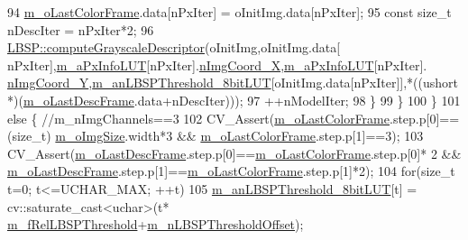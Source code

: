 \begin{DoxyCode}
94                 \mbox{\hyperlink{class_background_subtractor_l_b_s_p_ab1dc003792ab1d0b881a6fd10e0e29b3}{m\_oLastColorFrame}}.data[nPxIter] = oInitImg.data[nPxIter];
95                 \textcolor{keyword}{const} \textcolor{keywordtype}{size\_t} nDescIter = nPxIter*2;
96                 \mbox{\hyperlink{class_l_b_s_p_a4a5f635868b6b81ba53df2692ee3dfd8}{LBSP::computeGrayscaleDescriptor}}(oInitImg,oInitImg.data[
      nPxIter],\mbox{\hyperlink{class_background_subtractor_l_b_s_p_a74e73d4832ccdef652d93756582024db}{m\_aPxInfoLUT}}[nPxIter].\mbox{\hyperlink{struct_background_subtractor_l_b_s_p_1_1_px_info_base_a10966fe72f000045adede9e853156b48}{nImgCoord\_X}},\mbox{\hyperlink{class_background_subtractor_l_b_s_p_a74e73d4832ccdef652d93756582024db}{m\_aPxInfoLUT}}[nPxIter].
      \mbox{\hyperlink{struct_background_subtractor_l_b_s_p_1_1_px_info_base_a42cb6eecda647b2a11b90ea420f2bc31}{nImgCoord\_Y}},\mbox{\hyperlink{class_background_subtractor_l_b_s_p_aefe69d94f08b2c4ba73ad1d254ad9153}{m\_anLBSPThreshold\_8bitLUT}}[oInitImg.data[nPxIter]],*((ushort
      *)(\mbox{\hyperlink{class_background_subtractor_l_b_s_p_a9c637c0b87cac495887295690d83ba13}{m\_oLastDescFrame}}.data+nDescIter)));
97                 ++nModelIter;
98             \}
99         \}
100     \}
101     \textcolor{keywordflow}{else} \{ \textcolor{comment}{//m\_nImgChannels==3}
102         CV\_Assert(\mbox{\hyperlink{class_background_subtractor_l_b_s_p_ab1dc003792ab1d0b881a6fd10e0e29b3}{m\_oLastColorFrame}}.step.p[0]==(\textcolor{keywordtype}{size\_t})
      \mbox{\hyperlink{class_background_subtractor_l_b_s_p_a732d5e6ae35fb0e858cadb3af5ce08a2}{m\_oImgSize}}.width*3 && \mbox{\hyperlink{class_background_subtractor_l_b_s_p_ab1dc003792ab1d0b881a6fd10e0e29b3}{m\_oLastColorFrame}}.step.p[1]==3);
103         CV\_Assert(\mbox{\hyperlink{class_background_subtractor_l_b_s_p_a9c637c0b87cac495887295690d83ba13}{m\_oLastDescFrame}}.step.p[0]==\mbox{\hyperlink{class_background_subtractor_l_b_s_p_ab1dc003792ab1d0b881a6fd10e0e29b3}{m\_oLastColorFrame}}.step.p[0]*
      2 && \mbox{\hyperlink{class_background_subtractor_l_b_s_p_a9c637c0b87cac495887295690d83ba13}{m\_oLastDescFrame}}.step.p[1]==\mbox{\hyperlink{class_background_subtractor_l_b_s_p_ab1dc003792ab1d0b881a6fd10e0e29b3}{m\_oLastColorFrame}}.step.p[1]*2);
104         \textcolor{keywordflow}{for}(\textcolor{keywordtype}{size\_t} t=0; t<=UCHAR\_MAX; ++t)
105             \mbox{\hyperlink{class_background_subtractor_l_b_s_p_aefe69d94f08b2c4ba73ad1d254ad9153}{m\_anLBSPThreshold\_8bitLUT}}[t] = cv::saturate\_cast<uchar>(t*
      \mbox{\hyperlink{class_background_subtractor_l_b_s_p_ad759c645b14e9b16bf3940cae862df32}{m\_fRelLBSPThreshold}}+\mbox{\hyperlink{class_background_subtractor_l_b_s_p_a209eb6aaa34e8ad8e565e79f85404e24}{m\_nLBSPThresholdOffset}});

\end{DoxyCode}
